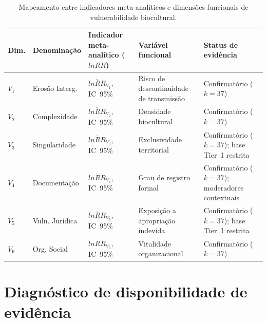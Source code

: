 \documentclass[12pt,a4paper]{article}
\begin{document}
\begin{table}[H]
\caption{Mapeamento entre indicadores meta-analíticos e dimensões funcionais de vulnerabilidade biocultural.}
\label{tab:mapping}
\centering
\small
\begin{tabular}{p{0.8cm}p{2.0cm}p{3.5cm}p{2.5cm}p{3.0cm}}
\toprule
\textbf{Dim.} & \textbf{Denominação} & \textbf{Indicador meta-analítico ($lnRR$)} & \textbf{Variável funcional} & \textbf{Status de evidência} \\
\midrule
$V_1$ & Erosão Interg. & $\overline{lnRR}_{V_1}$, IC~95\% & Risco de descontinuidade de transmissão & Confirmatório ($k = 37$) \\
$V_2$ & Complexidade & $\overline{lnRR}_{V_2}$, IC~95\% & Densidade biocultural & Confirmatório ($k = 37$) \\
$V_3$ & Singularidade & $\overline{lnRR}_{V_3}$, IC~95\% & Exclusividade territorial & Confirmatório ($k = 37$); base Tier~1 restrita \\
$V_4$ & Documentação & $\overline{lnRR}_{V_4}$, IC~95\% & Grau de registro formal & Confirmatório ($k = 37$); moderadores contextuais \\
$V_5$ & Vuln. Jurídica & $\overline{lnRR}_{V_5}$, IC~95\% & Exposição a apropriação indevida & Confirmatório ($k = 37$); base Tier~1 restrita \\
$V_6$ & Org. Social & $\overline{lnRR}_{V_6}$, IC~95\% & Vitalidade organizacional & Confirmatório ($k = 37$) \\
\bottomrule
\end{tabular}
\end{table}

\newpage

\section{Diagnóstico de disponibilidade de evidência}
\label{app:viability}
\end{document}
